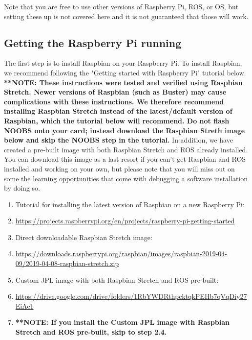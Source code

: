 \documentclass{article}
\begin{document}
Note that you are free to use other versions of Raspberry Pi, ROS, or OS, but setting these up is not covered here
and it is not guaranteed that those will work.

\subsection{Getting the Raspberry Pi running}
The first step is to install Raspbian on your Raspberry Pi. To install Raspbian,
we recommend following the "Getting started with Raspberry Pi" tutorial below.  \textbf{**NOTE: These instructions were tested and verified using Raspbian Stretch.  Newer versions of Raspbian (such as Buster) may cause complications with these instructions.  We therefore recommend installing Raspbian Stretch instead of the latest/default version of Raspbian, which the tutorial below will recommend.  Do not flash NOOBS onto your card; instead download the Raspbian Streth image below and skip the NOOBS step in the tutorial.}  In addition, we have created a pre-built image with both Raspbian Stretch and ROS already installed.  You can download this image as a last resort if you can't get Raspbian and ROS installed and working on your own, but please note that you will miss out on some the learning opportunities that come with debugging a software installation by doing so.  

\begin{enumerate}
	\item[] Tutorial for installing the latest version of Raspbian on a new Raspberry Pi:
	\item[] \href{https://projects.raspberrypi.org/en/projects/raspberry-pi-getting-started}{https://projects.raspberrypi.org/en/projects/raspberry-pi-getting-started}
	\item[] Direct downloadable Raspbian Stretch image: 
	\item[] \href{https://downloads.raspberrypi.org/raspbian/images/raspbian-2019-04-09/2019-04-08-raspbian-stretch.zip}{https://downloads.raspberrypi.org/raspbian/images/raspbian-2019-04-09/2019-04-08-raspbian-stretch.zip}
	\item[] Custom JPL image with both Raspbian Stretch and ROS pre-built:
	\item[] \href{https://drive.google.com/drive/folders/1RbYWDRthpcktqkPEHb7qVqDiy27EiAc1}{https://drive.google.com/drive/folders/1RbYWDRthpcktqkPEHb7qVqDiy27EiAc1}
	\item[] \textbf{**NOTE: If you install the Custom JPL image with Raspbian Stretch and ROS pre-built, skip to step 2.4.} 
\end{enumerate}
\end{document}
